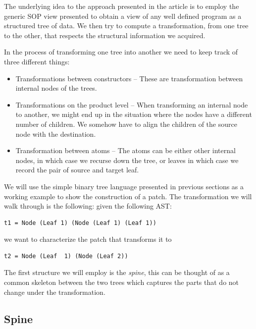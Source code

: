 \documentclass[11pt, titlepage]{article}
\begin{document}
The underlying idea to the approach presented in the article is to employ
the generic SOP view presented to obtain a view of any well defined program as a structured tree of data.  
We then try to compute a transformation, from one tree to the other, that respects the structural information we acquired.

In the process of transforming one tree into another we need to keep track of three different things: 
\begin{itemize}
  \item Transformations between constructors -- These are transformation between internal nodes of the trees.
  \item Transformations on the product level -- When transforming an internal node to another, we might end up in the situation where the nodes have a different number of children. We somehow have to align the children of the source node with the destination.
  \item Transformation between atoms -- The atoms can be either other internal nodes, in which case we recurse down the tree, or leaves in which case we record the pair of source and target leaf.
\end{itemize}

We will use the simple binary tree language presented in previous sections as a 
working example to show the construction of a patch. The transformation we will walk through is the following:
given the following AST:
\begin{verbatim}
t1 = Node (Leaf 1) (Node (Leaf 1) (Leaf 1))
\end{verbatim}
we want to characterize the patch that transforms it to 
\begin{verbatim}
t2 = Node (Leaf  1) (Node (Leaf 2))
\end{verbatim}

The first structure we will employ is the \emph{spine}, this can be thought of as a common skeleton between 
the two trees which captures the parts that do not change under the transformation.

\subsection{Spine}\label{spine}
\end{document}
